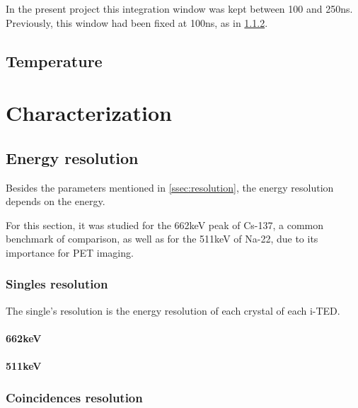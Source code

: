 In the present project this integration window was kept between 100 and 250ns. Previously, this window had been fixed at 100ns, as in \ref{}.

\subsection{Temperature}\label{ssec:temperature}

\section{Characterization}\label{sec:characterization}

\subsection{Energy resolution}

Besides the parameters mentioned in \ref{ssec:resolution}, the energy resolution depends on the energy.

For this section, it was studied for the 662keV peak of Cs-137, a common benchmark of comparison, as well as for the 511keV of Na-22, due to its importance for PET imaging.

\subsubsection{Singles resolution}

The single's resolution is the energy resolution of each crystal of each i-TED.

\paragraph*{662keV}

\paragraph*{511keV}

\subsubsection{Coincidences resolution}

